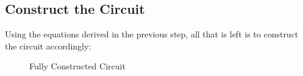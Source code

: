 \documentclass[12pt]{article}
\begin{document}
\subsection{Construct the Circuit}
\label{ssec:constructTheCircuit}

Using the equations derived in the previous step, all that is left is to construct the
circuit accordingly:

\begin{figure}[H]
  \centering
  
  \caption{Fully Constructed Circuit}
  \label{fig:fullyConstructedCircuitOne}
\end{figure}
\end{document}
